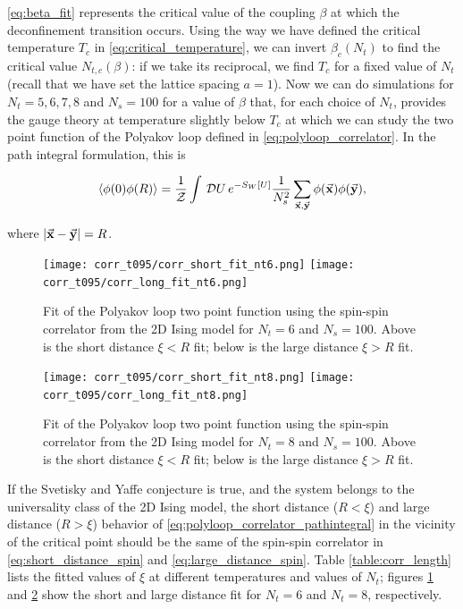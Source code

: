 \documentclass[reqno,12pt]{article}
\numberwithin{equation}{section}
\newcommand{\D}[1]{\,\mathcal{D}#1\,}
\newcommand{\Z}{\mathcal{Z}}
\begin{document}
\eqref{eq:beta_fit} represents the critical value of the coupling $\beta$ at which the deconfinement transition occurs.
Using the way we have defined the critical temperature $T_c$ in \eqref{eq:critical_temperature}, we can invert $\beta_c(N_t)$
to find the critical value $N_{t,c}(\beta)$: if we take its reciprocal, we find $T_c$ for a fixed value of $N_t$ (recall
that we have set the lattice spacing $a = 1$). Now we can do simulations for $N_t = 5, 6, 7, 8$ and $N_s = 100$ for a value of
$\beta$ that, for each choice of $N_t$, provides the gauge theory at temperature slightly below $T_c$ at which we can study
the two point function of the Polyakov loop defined in \eqref{eq:polyloop_correlator}. In the path integral formulation,
this is

\begin{equation} \label{eq:polyloop_correlator_pathintegral}
	\expval{\phi(0) \phi(R)} = \frac{1}{\Z} \int \D U e^{-S_W[U]} \frac{1}{N_s^2} \sum_{\va{x}, \va{y}}\phi(\va{x}) \phi(\va{y}),
\end{equation}

where $|\va{x} - \va{y}| = R$.

\begin{figure}[h]
	\centering
	\texttt{[image: corr\_t095/corr\_short\_fit\_nt6.png]}
	\texttt{[image: corr\_t095/corr\_long\_fit\_nt6.png]}
	\caption[Polyakov loop correlator fit for $N_t=6$]{
		Fit of the Polyakov loop two point function using the spin-spin correlator from the 2D Ising model
		for $N_t = 6$ and $N_s = 100$. Above is the short distance $\xi < R$ fit; below is the large distance $\xi > R$ fit.
	}
\label{fig:corr_fit_nt6}
\end{figure}

\begin{figure}[h]
	\centering
	\texttt{[image: corr\_t095/corr\_short\_fit\_nt8.png]}
	\texttt{[image: corr\_t095/corr\_long\_fit\_nt8.png]}
	\caption[Polyakov loop correlator fit for $N_t=8$]{
		Fit of the Polyakov loop two point function using the spin-spin correlator from the 2D Ising model
		for $N_t = 8$ and $N_s = 100$. Above is the short distance $\xi < R$ fit; below is the large distance $\xi > R$ fit.
	}
\label{fig:corr_fit_nt8}
\end{figure}


If the Svetisky and Yaffe conjecture is true, and the system belongs to the universality class of the 2D Ising model, the 
short distance ($R < \xi$) and large distance ($R > \xi$) behavior of \eqref{eq:polyloop_correlator_pathintegral} 
in the vicinity of the critical point should be the same of the spin-spin
correlator in \eqref{eq:short_distance_spin} and \eqref{eq:large_distance_spin}. Table \ref{table:corr_length} lists the fitted
values of $\xi$ at different temperatures and values of $N_t$; figures \ref{fig:corr_fit_nt6} and
\ref{fig:corr_fit_nt8} show the short and large distance fit for $N_t = 6$ and $N_t = 8$, respectively.
\end{document}
